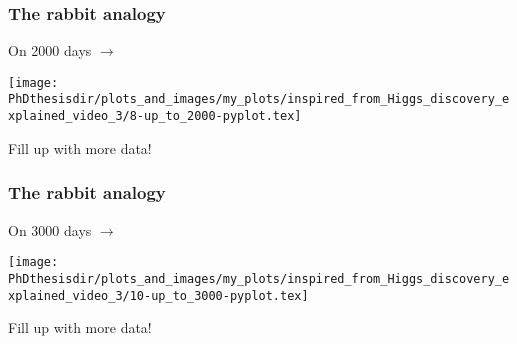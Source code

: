 \begin{frame}
\frametitle{The rabbit analogy}
\addtocounter{framenumber}{-1}
\transwipe[direction=90]
\begin{center}
\begin{minipage}[c]{.29\textwidth}
On \num{2000} days $\rightarrow$
\end{minipage}
\begin{minipage}[c]{.4\textwidth}
\vspace{-\baselineskip}
\texttt{[image: \\PhDthesisdir/plots\_and\_images/my\_plots/inspired\_from\_Higgs\_discovery\_explained\_video\_3/8-up\_to\_2000-pyplot.tex]}
\end{minipage}
\begin{minipage}[c]{.29\textwidth}
Fill up with more data!
\end{minipage}
\end{center}
\end{frame}


\begin{frame}
\frametitle{The rabbit analogy}
\addtocounter{framenumber}{-1}
\transwipe[direction=90]
\begin{center}
\begin{minipage}[c]{.29\textwidth}
On \num{3000} days $\rightarrow$
\end{minipage}
\begin{minipage}[c]{.4\textwidth}
\vspace{-\baselineskip}
\texttt{[image: \\PhDthesisdir/plots\_and\_images/my\_plots/inspired\_from\_Higgs\_discovery\_explained\_video\_3/10-up\_to\_3000-pyplot.tex]}
\end{minipage}
\begin{minipage}[c]{.29\textwidth}
Fill up with more data!
\end{minipage}
\end{center}
\end{frame}

